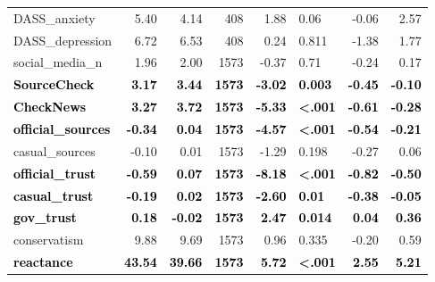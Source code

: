 \documentclass[]{article}
\begin{document}
\begin{table}[H]
\begin{tabular}[t]{lrrrrlrr}
\addlinespace
DASS\_anxiety & 5.40 & 4.14 & 408 & 1.88 & 0.06 & -0.06 & 2.57\\
DASS\_depression & 6.72 & 6.53 & 408 & 0.24 & 0.811 & -1.38 & 1.77\\
social\_media\_n & 1.96 & 2.00 & 1573 & -0.37 & 0.71 & -0.24 & 0.17\\
\textcolor{black}{\textbf{SourceCheck}} & \textcolor{black}{\textbf{3.17}} & \textcolor{black}{\textbf{3.44}} & \textcolor{black}{\textbf{1573}} & \textcolor{black}{\textbf{-3.02}} & \textcolor{black}{\textbf{0.003}} & \textcolor{black}{\textbf{-0.45}} & \textcolor{black}{\textbf{-0.10}}\\
\textcolor{black}{\textbf{CheckNews}} & \textcolor{black}{\textbf{3.27}} & \textcolor{black}{\textbf{3.72}} & \textcolor{black}{\textbf{1573}} & \textcolor{black}{\textbf{-5.33}} & \textcolor{black}{\textbf{<.001}} & \textcolor{black}{\textbf{-0.61}} & \textcolor{black}{\textbf{-0.28}}\\
\addlinespace
\textcolor{black}{\textbf{official\_sources}} & \textcolor{black}{\textbf{-0.34}} & \textcolor{black}{\textbf{0.04}} & \textcolor{black}{\textbf{1573}} & \textcolor{black}{\textbf{-4.57}} & \textcolor{black}{\textbf{<.001}} & \textcolor{black}{\textbf{-0.54}} & \textcolor{black}{\textbf{-0.21}}\\
casual\_sources & -0.10 & 0.01 & 1573 & -1.29 & 0.198 & -0.27 & 0.06\\
\textcolor{black}{\textbf{official\_trust}} & \textcolor{black}{\textbf{-0.59}} & \textcolor{black}{\textbf{0.07}} & \textcolor{black}{\textbf{1573}} & \textcolor{black}{\textbf{-8.18}} & \textcolor{black}{\textbf{<.001}} & \textcolor{black}{\textbf{-0.82}} & \textcolor{black}{\textbf{-0.50}}\\
\textcolor{black}{\textbf{casual\_trust}} & \textcolor{black}{\textbf{-0.19}} & \textcolor{black}{\textbf{0.02}} & \textcolor{black}{\textbf{1573}} & \textcolor{black}{\textbf{-2.60}} & \textcolor{black}{\textbf{0.01}} & \textcolor{black}{\textbf{-0.38}} & \textcolor{black}{\textbf{-0.05}}\\
\textcolor{black}{\textbf{gov\_trust}} & \textcolor{black}{\textbf{0.18}} & \textcolor{black}{\textbf{-0.02}} & \textcolor{black}{\textbf{1573}} & \textcolor{black}{\textbf{2.47}} & \textcolor{black}{\textbf{0.014}} & \textcolor{black}{\textbf{0.04}} & \textcolor{black}{\textbf{0.36}}\\
\addlinespace
conservatism & 9.88 & 9.69 & 1573 & 0.96 & 0.335 & -0.20 & 0.59\\
\textcolor{black}{\textbf{reactance}} & \textcolor{black}{\textbf{43.54}} & \textcolor{black}{\textbf{39.66}} & \textcolor{black}{\textbf{1573}} & \textcolor{black}{\textbf{5.72}} & \textcolor{black}{\textbf{<.001}} & \textcolor{black}{\textbf{2.55}} & \textcolor{black}{\textbf{5.21}}\\

\end{tabular}
\end{table}
\end{document}
